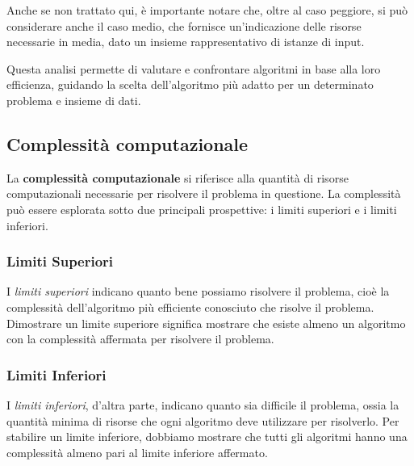 Anche se non trattato qui, è importante notare che, oltre al caso peggiore, si può
considerare anche il caso medio, che fornisce un'indicazione delle risorse necessarie
in media, dato un insieme rappresentativo di istanze di input.

Questa analisi permette di valutare e confrontare algoritmi in base alla loro efficienza,
guidando la scelta dell'algoritmo più adatto per un determinato problema e insieme di dati.

\subsection{Complessità computazionale}

La \textbf{complessità computazionale} si riferisce alla quantità di risorse
computazionali necessarie per risolvere il problema in questione. La complessità può
essere esplorata sotto due principali prospettive: i limiti superiori e i limiti inferiori.

\subsubsection{Limiti Superiori}
I \textit{limiti superiori} indicano quanto bene possiamo risolvere il problema, cioè
la complessità dell'algoritmo più efficiente conosciuto che risolve il problema.
Dimostrare un limite superiore significa mostrare che esiste almeno un algoritmo
con la complessità affermata per risolvere il problema.

\subsubsection{Limiti Inferiori}
I \textit{limiti inferiori}, d'altra parte, indicano quanto sia difficile il problema,
ossia la quantità minima di risorse che ogni algoritmo deve utilizzare per risolverlo.
Per stabilire un limite inferiore, dobbiamo mostrare che tutti gli algoritmi hanno una
complessità almeno pari al limite inferiore affermato.

